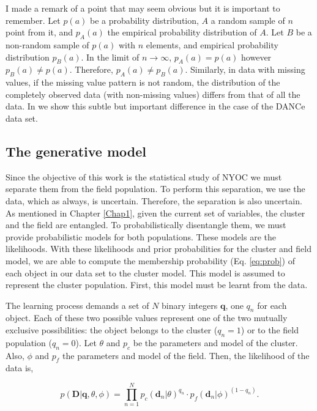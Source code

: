 I made a remark of a point that may seem obvious but it is important to remember. Let $p(a)$ be a probability distribution, $A$ a random sample of $n$ point from it, and $p_A(a)$ the empirical probability distribution of $A$. Let $B$ be a non-random sample of $p(a)$ with $n$ elements, and empirical probability distribution $p_B(a)$. In the limit of $n\rightarrow \infty$, $p_A(a)=p(a)$ however $p_B(a)\neq p(a)$. Therefore, $p_A(a)\neq p_B(a)$. Similarly, in data with missing values, if the missing value pattern is not random, the distribution of the completely observed data (with non-missing values) differs from that of all the data. In \citet{Olivares2017} we show this subtle but important difference in the case of the DANCe data set. 

\subsection{The generative model}
\label{subsect:generative-model}
Since the objective of this work is the statistical study of NYOC we must separate them from the field population. To perform this separation, we use the data, which as always, is uncertain. Therefore, the separation is also uncertain. As mentioned in Chapter \ref{Chap1}, given the current set of variables, the cluster and the field are entangled. To probabilistically disentangle them, we must provide probabilistic models for both populations. These models are the likelihoods. With these likelihoods and prior probabilities for the cluster and field model, we are able to compute the membership probability (Eq. \ref{eq:prob}) of each object in our data set to the cluster model. This model is assumed to represent the cluster population. First, this model must be learnt from the data.  

The learning process demands a set of $N$ binary integers $\mathbf{q}$, one $q_n$ for each object. Each of these two possible values represent one of the two mutually exclusive possibilities: the object belongs to the cluster ($q_n=1$) or to the field population ($q_n=0$). Let $\theta$ and $p_c$ be the parameters and model of the cluster. Also, $\phi$ and $p_f$ the parameters and model of the field. Then, the likelihood of the data is,

\begin{equation}
p(\mathbf{D}|\mathbf{q},\theta,\phi)= \prod_{n=1}^N {p_c(\mathbf{d}_n|\theta)}^{q_n}\cdot {p_f(\mathbf{d}_n|\phi)}^{(1-q_n)}.
\end{equation}

